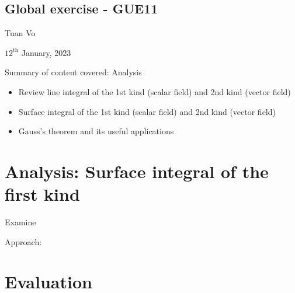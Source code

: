 \documentclass[12pt]{article}
\begin{document}
\begin{center}
	\section*{Global exercise - GUE11}
\end{center}
\begin{center}
	Tuan Vo
\end{center}
\begin{center}
	$12^{\text{th}}$ January, 2023
\end{center}
Summary of content covered: Analysis
		\begin{itemize}
			\item Review line integral of the 1st kind (scalar field) and 2nd kind (vector field)
			\item Surface integral of the 1st kind (scalar field) and 2nd kind (vector field)
			\item Gauss's theorem and its useful applications
		\end{itemize}
\section{Analysis: Surface integral of the first kind}
\begin{exampleboxed}
	Examine
\end{exampleboxed}
Approach:
\clearpage
\section{Evaluation}


% 
\end{document}
